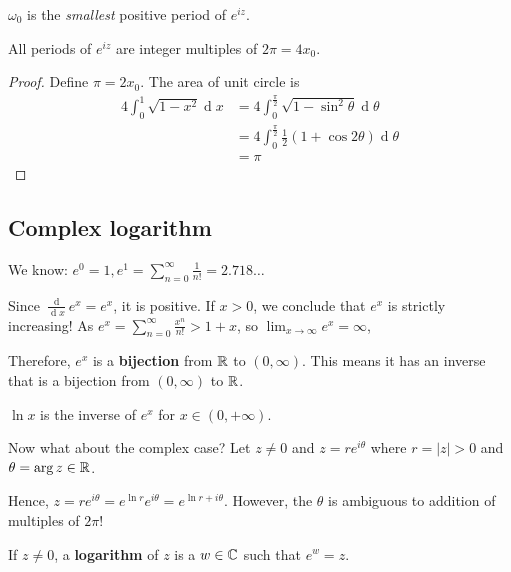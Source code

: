 \documentclass[12pt]{article}
\renewcommand{\d}{\ensuremath{\operatorname{d}}}
\begin{document}
\begin{proposition}
    $\omega_0$ is the \textit{smallest} positive period of $e^{iz}$.
\end{proposition}

\begin{proposition}
    All periods of $e^{iz}$ are integer multiples of $2\pi=4x_0$.
\end{proposition}

\begin{proof}
    Define $\pi=2x_0$. The area of unit circle is \begin{align*}
        4\int_{0}^{1}\sqrt{1-x^2}\d x &= 4\int_{0}^{\frac{\pi}{2}}\sqrt{1-\sin^2 \theta}\d \theta\\
        &= 4\int_{0}^{\frac{\pi}{2}}\frac{1}{2}(1+\cos 2\theta)\d \theta\\
        &= \pi
    \end{align*}
\end{proof}

\subsection{Complex logarithm}
We know: $e^0=1,e^1=\sum_{n=0}^{\infty}\frac{1}{n!}=2.718\dots$

Since $\frac{\d}{\d x}e^x=e^x$, it is positive. If $x>0$, we conclude that $e^x$ is strictly increasing! As $e^x=\sum_{n=0}^{\infty}\frac{x^n}{n!}>1+x$, so $\lim_{x\to \infty}e^x=\infty$,

Therefore, $e^x$ is a \textbf{bijection} from $\mathbb{R}$ to $(0,\infty)$. This means it has an inverse that is a bijection from $(0,\infty)$ to $\mathbb{R}$.

 $\ln x$ is the inverse of $e^x$ for $x\in (0,+\infty)$.

Now what about the complex case? Let $z\neq 0$ and $z=re^{i\theta}$ where $r=|z|>0$ and $\theta=\arg z\in \mathbb{R}$.

Hence, $z=re^{i\theta}=e^{\ln r}e^{i\theta}=e^{\ln r+i\theta}$. However, the $\theta$ is ambiguous to addition of multiples of $2\pi$!

 If $z\neq 0$, a \textbf{logarithm} of $z$ is a $w\in \mathbb{C}$ such that $e^{w}=z$.
\end{document}
